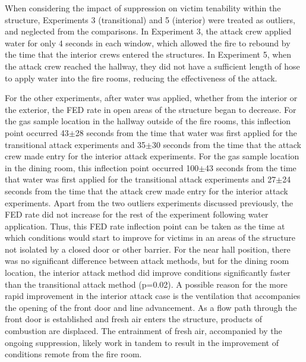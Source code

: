 \documentclass[12pt,oneside]{article}
\begin{document}
When considering the impact of suppression on victim tenability within the structure, Experiments 3 (transitional) and 5 (interior) were treated as outliers, and neglected from the comparisons. In Experiment 3, the attack crew applied water for only 4 seconds in each window, which allowed the fire to rebound by the time that the interior crews entered the structures. In Experiment 5, when the attack crew reached the hallway, they did not have a sufficient length of hose to apply water into the fire rooms, reducing the effectiveness of the attack. 

For the other experiments, after water was applied, whether from the interior or the exterior, the FED rate in open areas of the structure began to decrease. For the gas sample location in the hallway outside of the fire rooms, this inflection point occurred 43$\pm$28 seconds from the time that water was first applied for the transitional attack experiments and 35$\pm$30 seconds from the time that the attack crew made entry for the interior attack experiments. For the gas sample location in the dining room, this inflection point occurred 100$\pm$43 seconds from the time that water was first applied for the transitional attack experiments and 27$\pm$24 seconds from the time that the attack crew made entry for the interior attack experiments. Apart from the two outliers experiments discussed previously, the FED rate did not increase for the rest of the experiment following water application. Thus, this FED rate inflection point can be taken as the time at which conditions would start to improve for victims in an areas of the structure not isolated by a closed door or other barrier. For the near hall position, there was no significant difference between attack methods, but for the dining room location, the interior attack method did improve conditions significantly faster than the transitional attack method (p=0.02). A possible reason for the more rapid improvement in the interior attack case is the ventilation that accompanies the opening of the front door and line advancement. As a flow path through the front door is established and fresh air enters the structure, products of combustion are displaced. The entrainment of fresh air, accompanied by the ongoing suppression, likely work in tandem to result in the improvement of conditions remote from the fire room. 
\end{document}
